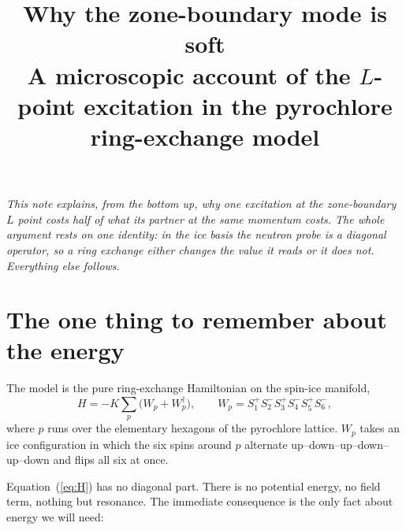 \documentclass[11pt]{article}
\title{\bfseries Why the zone-boundary mode is soft\\[2pt]
\large A microscopic account of the $L$-point excitation in the
pyrochlore ring-exchange model}
\author{}
\date{}
\newcommand{\Wp}{W_p}
\newcommand{\Wpd}{W_p^{\dagger}}
\begin{document}
\maketitle
\vspace{-3.2em}

\begin{center}
\begin{minipage}{0.9\textwidth}\small\itshape
This note explains, from the bottom up, why one excitation at the
zone-boundary $L$ point costs half of what its partner at the same
momentum costs. The whole argument rests on one identity: in the ice
basis the neutron probe is a \emph{diagonal} operator, so a ring
exchange either changes the value it reads or it does not. Everything
else follows.
\end{minipage}
\end{center}

\vspace{0.8em}

\section{The one thing to remember about the energy}

The model is the pure ring-exchange Hamiltonian on the spin-ice
manifold,
\begin{equation}
H=-K\sum_p\bigl(\Wp+\Wpd\bigr),
\qquad
\Wp=S^+_1S^-_2S^+_3S^-_4S^+_5S^-_6 ,
\label{eq:H}
\end{equation}
where $p$ runs over the elementary hexagons of the pyrochlore lattice.
$\Wp$ takes an ice configuration in which the six spins around $p$
alternate up--down--up--down--up--down and flips all six at once.

Equation~(\ref{eq:H}) has no diagonal part. There is no potential
energy, no field term, nothing but resonance. The immediate consequence
is the only fact about energy we will need:

\begin{center}
\end{center}
\end{document}
